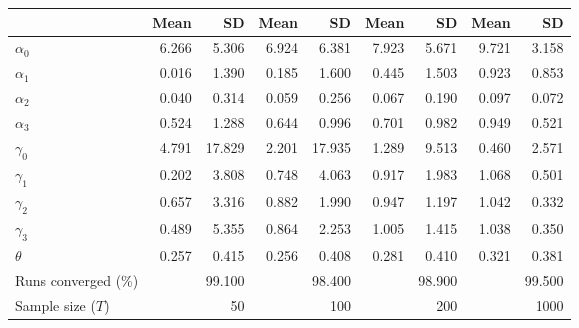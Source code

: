 
\begin{tabular}[t]{lrrrrrrrr}
\toprule
  & Mean & SD & Mean  & SD  & Mean   & SD   & Mean    & SD   \\
\midrule
$\alpha_{0}$ & 6.266 & 5.306 & 6.924 & 6.381 & 7.923 & 5.671 & 9.721 & 3.158\\
$\alpha_{1}$ & 0.016 & 1.390 & 0.185 & 1.600 & 0.445 & 1.503 & 0.923 & 0.853\\
$\alpha_{2}$ & 0.040 & 0.314 & 0.059 & 0.256 & 0.067 & 0.190 & 0.097 & 0.072\\
$\alpha_{3}$ & 0.524 & 1.288 & 0.644 & 0.996 & 0.701 & 0.982 & 0.949 & 0.521\\
$\gamma_{0}$ & 4.791 & 17.829 & 2.201 & 17.935 & 1.289 & 9.513 & 0.460 & 2.571\\
$\gamma_{1}$ & 0.202 & 3.808 & 0.748 & 4.063 & 0.917 & 1.983 & 1.068 & 0.501\\
$\gamma_{2}$ & 0.657 & 3.316 & 0.882 & 1.990 & 0.947 & 1.197 & 1.042 & 0.332\\
$\gamma_{3}$ & 0.489 & 5.355 & 0.864 & 2.253 & 1.005 & 1.415 & 1.038 & 0.350\\
$\theta$ & 0.257 & 0.415 & 0.256 & 0.408 & 0.281 & 0.410 & 0.321 & 0.381\\
Runs converged (\%) &  & 99.100 &  & 98.400 &  & 98.900 &  & 99.500\\
Sample size ($T$) &  & 50 &  & 100 &  & 200 &  & 1000\\
\bottomrule
\end{tabular}
